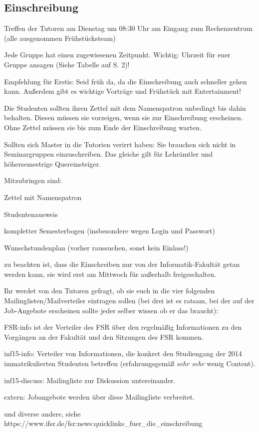 \documentclass[a4paper,12pt]{report}
\begin{document}
\subsection{Einschreibung}
\begin{itemize*}
	\item Treffen der Tutoren am Dienstag um 08:30 Uhr am Eingang zum Rechenzentrum (alle ausgenommen Frühstücksteam)
	\item Jede Gruppe hat einen zugewiesenen Zeitpunkt. Wichtig: Uhrzeit für euer Gruppe ansagen (Siehe Tabelle auf S. 2)!
	\item Empfehlung für Erstis: Seid früh da, da die Einschreibung auch schneller gehen kann. Außerdem gibt es wichtige Vorträge und Frühstück mit Entertainment!
	\item Die Studenten sollten ihren Zettel mit dem Namenspatron unbedingt bis dahin behalten.
	Diesen müssen sie vorzeigen, wenn sie zur Einschreibung erscheinen. Ohne Zettel müssen sie bis zum Ende der Einschreibung warten.
	\item Sollten sich Master in die Tutorien verirrt haben:
	Sie brauchen sich nicht in Seminargruppen einzuschreiben.
	Das gleiche gilt für Lehrämtler und höhersemestrige Quereinsteiger.
	\item Mitzubringen sind:
		\begin{itemize*}
		\item Zettel mit Namenspatron
		\item Studentenausweis
		\item kompletter Semesterbogen (insbesondere wegen Login und Passwort)
		\item Wunschstundenplan (vorher raussuchen, sonst kein Einlass!)
		\item zu beachten ist, dass die Einschreiben nur von der Informatik-Fakultät getan werden kann, sie wird erst am Mittwoch für außerhalb freigeschalten.
	\end{itemize*}
	\item Ihr werdet von den Tutoren gefragt, ob sie euch in die vier folgenden Mailinglisten/Mailverteiler eintragen sollen (bei drei ist es ratsam, bei der auf der Job-Angebote erscheinen sollte jeder selber wissen ob er das braucht):
		\begin{itemize*}
		\item FSR-info ist der Verteiler des FSR über den regelmäßig Informationen zu den Vorgängen an der Fakultät und den Sitzungen des FSR kommen.
		\item inf15-info: Verteiler von Informationen, die konkret den Studiengang der 2014 immatrikulierten Studenten betreffen (erfahrungsgemäß \textit{sehr sehr} wenig Content).
		\item inf15-discuss: Mailingliste zur Diskussion untereinander.
		\item extern: Jobangebote werden über diese Mailingliste verbreitet.
		\item und diverse andere, siehe \\ https://www.ifsr.de/fsr:news:quicklinks\_fuer\_die\_einschreibung
	\end{itemize*}
\end{itemize*}
\end{document}
